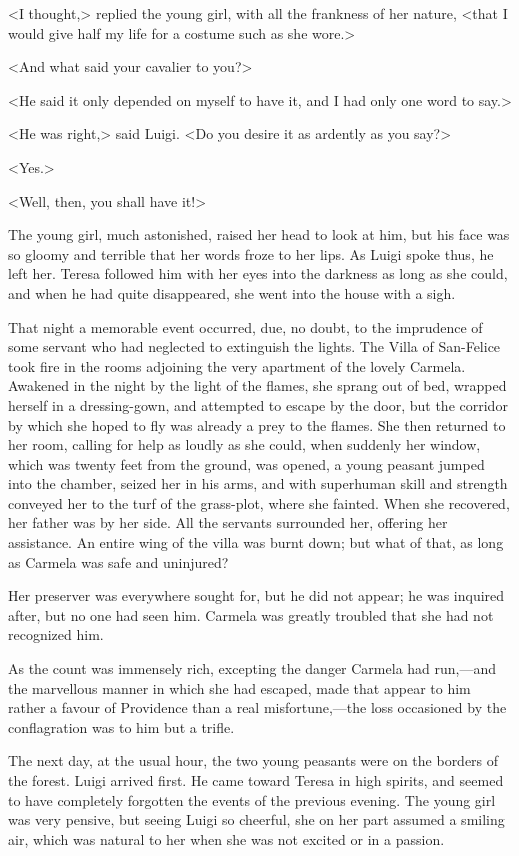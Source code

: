 {<I thought,> replied the young girl, with all the frankness of her nature, <that I would give half my life for a costume such as she wore.> 

<And what said your cavalier to you?> 

<He said it only depended on myself to have it, and I had only one word to say.> 

<He was right,> said Luigi. <Do you desire it as ardently as you say?> 

<Yes.> 

<Well, then, you shall have it!> 

The young girl, much astonished, raised her head to look at him, but his face was so gloomy and terrible that her words froze to her lips. As Luigi spoke thus, he left her. Teresa followed him with her eyes into the darkness as long as she could, and when he had quite disappeared, she went into the house with a sigh.  

That night a memorable event occurred, due, no doubt, to the imprudence of some servant who had neglected to extinguish the lights. The Villa of San-Felice took fire in the rooms adjoining the very apartment of the lovely Carmela. Awakened in the night by the light of the flames, she sprang out of bed, wrapped herself in a dressing-gown, and attempted to escape by the door, but the corridor by which she hoped to fly was already a prey to the flames. She then returned to her room, calling for help as loudly as she could, when suddenly her window, which was twenty feet from the ground, was opened, a young peasant jumped into the chamber, seized her in his arms, and with superhuman skill and strength conveyed her to the turf of the grass-plot, where she fainted. When she recovered, her father was by her side. All the servants surrounded her, offering her assistance. An entire wing of the villa was burnt down; but what of that, as long as Carmela was safe and uninjured? 

Her preserver was everywhere sought for, but he did not appear; he was inquired after, but no one had seen him. Carmela was greatly troubled that she had not recognized him. 

As the count was immensely rich, excepting the danger Carmela had run,—and the marvellous manner in which she had escaped, made that appear to him rather a favour of Providence than a real misfortune,—the loss occasioned by the conflagration was to him but a trifle. 

The next day, at the usual hour, the two young peasants were on the borders of the forest. Luigi arrived first. He came toward Teresa in high spirits, and seemed to have completely forgotten the events of the previous evening. The young girl was very pensive, but seeing Luigi so cheerful, she on her part assumed a smiling air, which was natural to her when she was not excited or in a passion. 

}

